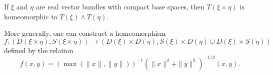 If $\xi$ and $\eta$ are real vector bundles with compact base spaces, then $T(\xi \times \eta)$ is homeomorphic to $T(\xi) \wedge T(\eta)$.

More generally, one can construct a homeomorphism
$$f: (D(\xi \times \eta), S(\xi \times \eta)) \rightarrow (D(\xi) \times D(\eta), S(\xi) \times D(\eta) \cup D(\xi) \times S(\eta))$$
defined by the relation
$$f(x, y) = \left( \max \left( \|x\|, \|y\| \right) \right)^{-1} \left( \|x\|^2 + \|y\|^2 \right)^{-1/2}(x, y).$$
